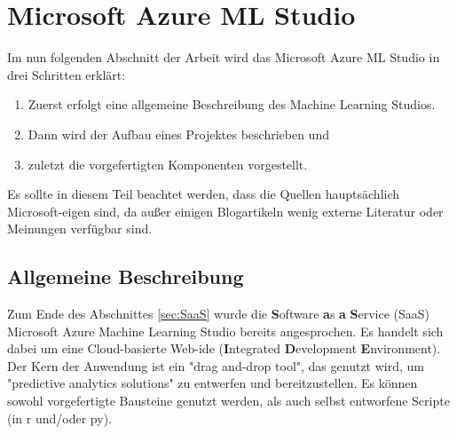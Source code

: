 \chapter{Microsoft Azure ML Studio}\label{sec:msmls}
Im nun folgenden Abschnitt der Arbeit wird das Microsoft Azure ML Studio in drei Schritten erklärt:
\begin{enumerate}
\item Zuerst erfolgt eine allgemeine Beschreibung des Machine Learning Studios.
\item Dann wird der Aufbau eines Projektes beschrieben und
\item zuletzt die vorgefertigten Komponenten vorgestellt.
\end{enumerate}
Es sollte in diesem Teil beachtet werden, dass die Quellen hauptsächlich Microsoft-eigen sind, da außer einigen Blogartikeln wenig externe Literatur oder Meinungen verfügbar sind.
\section{Allgemeine Beschreibung}\label{sec:ab1}
Zum Ende des Abschnittes \ref{sec:SaaS} wurde die \textbf{S}oftware \textbf{a}s \textbf{a} \textbf{S}ervice (SaaS) Microsoft Azure Machine Learning Studio bereits angesprochen. Es handelt sich dabei um eine Cloud-basierte Web-\gls{ide} (\textbf{I}ntegrated \textbf{D}evelopment \textbf{E}nvironment). Der Kern der Anwendung ist ein "drag and-drop tool", das genutzt wird, um "predictive analytics solutions" zu entwerfen und bereitzustellen.\citep{ericson_what_2017} Es können sowohl vorgefertigte Bausteine genutzt werden, als auch selbst entworfene Scripte (in \gls{r} und/oder \gls{py}).
